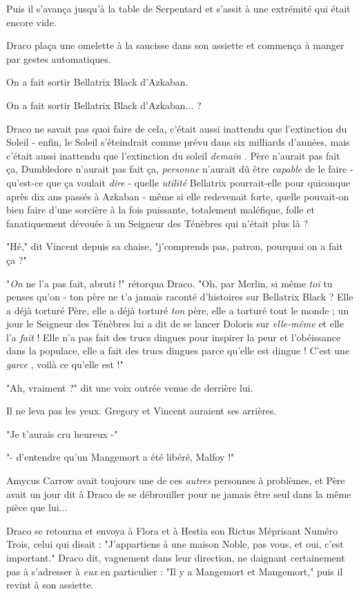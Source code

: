 Puis il s'avança jusqu'à la table de Serpentard et s'assit à une extrémité qui était encore vide.

Draco plaça une omelette à la saucisse dans son assiette et commença à manger par gestes automatiques.

On a fait sortir Bellatrix Black d'Azkaban.

On a fait sortir Bellatrix Black d'Azkaban... ?

Draco ne savait pas quoi faire de cela, c'était aussi inattendu que l'extinction du Soleil - enfin, le Soleil s'éteindrait comme prévu dans six milliards d'années, mais c'était aussi inattendu que l'extinction du soleil \emph{demain} . Père n'aurait pas fait ça, Dumbledore n'aurait pas fait ça, \emph{personne}  n'aurait dû être \emph{capable}  de le faire - qu'est-ce que ça voulait \emph{dire}  - quelle \emph{utilité}  Bellatrix pourrait-elle pour quiconque après dix ans passés à Azkaban - même si elle redevenait forte, quelle pouvait-on bien faire d'une sorcière à la fois puissante, totalement maléfique, folle et fanatiquement dévouée à un Seigneur des Ténèbres qui n'était plus là ?

"Hé," dit Vincent depuis sa chaise, "j'comprends pas, patron, pourquoi on a fait ça ?"

"\emph{On}  ne l'a pas fait, abruti !" rétorqua Draco. "Oh, par Merlin, si même \emph{toi}  tu penses qu'on - ton père ne t'a jamais raconté d'histoires sur Bellatrix Black ? Elle a déjà torturé Père, elle a déjà torturé \emph{ton}  père, elle a torturé tout le monde ; un jour le Seigneur des Ténèbres lui a dit de se lancer Doloris sur \emph{elle-même}  et elle l'a \emph{fait}  ! Elle n'a pas fait des trucs dingues pour inspirer la peur et l'obéissance dans la populace, elle a fait des trucs dingues parce qu'elle est dingue ! C'est une \emph{garce} , voilà ce qu'elle est !"

"Ah, vraiment ?" dit une voix outrée venue de derrière lui.

Il ne leva pas les yeux. Gregory et Vincent auraient ses arrières.

"Je t'aurais cru heureux -"

"- d'entendre qu'un Mangemort a été libéré, Malfoy !"

Amycus Carrow avait toujours une de ces \emph{autres}  personnes à problèmes, et Père avait un jour dit à Draco de se débrouiller pour ne jamais être seul dans la même pièce que lui...

Draco se retourna et envoya à Flora et à Hestia son Rictus Méprisant Numéro Trois, celui qui disait : "J'appartiens à une maison Noble, pas vous, et oui, c'est important." Draco dit, vaguement dans leur direction, ne daignant certainement pas à s'adresser à \emph{eux}  en particulier : "Il y a Mangemort et Mangemort," puis il revint à son assiette.

